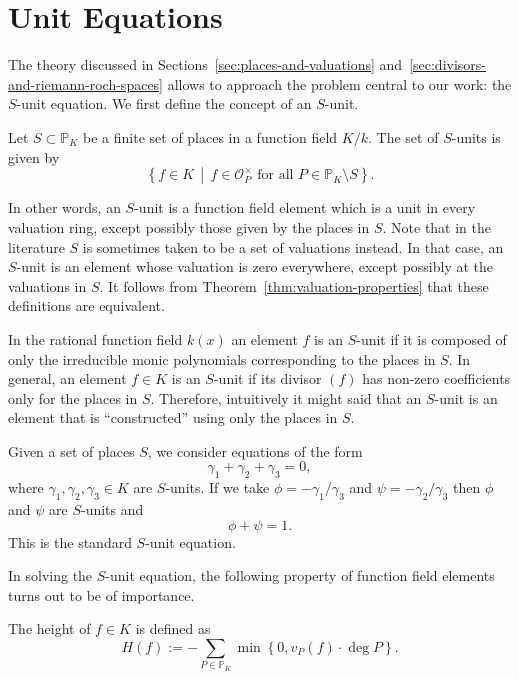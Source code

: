 \section{Unit Equations}%
\label{sec:unit-equations}

The theory discussed in Sections~\ref{sec:places-and-valuations} and~\ref{sec:divisors-and-riemann-roch-spaces} allows to approach the problem central to our work: the \(S\)-unit equation. We first define the concept of an \(S\)-unit.

\begin{definition}
  Let \(S \subset \mathbb{P}_{K}\) be a finite set of places in a function field \(K / k\). The set of \(S\)-units is given by
  \[\left\{ f \in K \,\middle|\, f \in \mathcal{O}_{P}^{\times} \text{ for all } P \in \mathbb{P}_{K} \setminus S \right\}.\]
\end{definition}

In other words, an \(S\)-unit is a function field element which is a unit in every valuation ring, except possibly those given by the places in \(S\). Note that in the literature \(S\) is sometimes taken to be a set of valuations instead. In that case, an \(S\)-unit is an element whose valuation is zero everywhere, except possibly at the valuations in \(S\). It follows from Theorem~\ref{thm:valuation-properties} that these definitions are equivalent.

In the rational function field \(k(x)\) an element \(f\) is an \(S\)-unit if it is composed of only the irreducible monic polynomials corresponding to the places in \(S\). In general, an element \(f \in K\) is an \(S\)-unit if its divisor \((f)\) has non-zero coefficients only for the places in \(S\). Therefore, intuitively it might said that an \(S\)-unit is an element that is ``constructed'' using only the places in \(S\).

Given a set of places \(S\), we consider equations of the form
\[\gamma_{1} + \gamma_{2} + \gamma_{3} = 0,\]
where \(\gamma_{1}, \gamma_{2}, \gamma_{3} \in K\) are \(S\)-units. If we take \(\phi = -\gamma_{1} / \gamma_{3}\) and \(\psi = -\gamma_{2} / \gamma_{3}\) then \(\phi\) and \(\psi\) are \(S\)-units and
\[\phi + \psi = 1.\]
This is the standard \(S\)-unit equation.

In solving the \(S\)-unit equation, the following property of function field elements turns out to be of importance.

\begin{definition}%
  \label{def:height}
  The height of \(f \in K\) is defined as
  \[H(f) := - \sum_{P \in \mathbb{P}_{K}} \min{\left\{ 0, v_{P}(f) \cdot \deg{P} \right\}}.\]
\end{definition}

